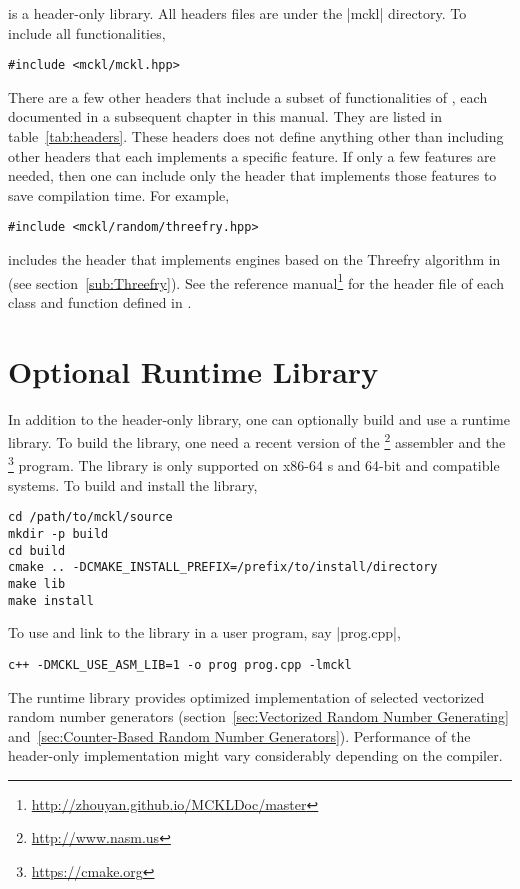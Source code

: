\mckl is a header-only library. All headers files are under the |mckl|
directory. To include all functionalities,
\begin{verbatim}
#include <mckl/mckl.hpp>
\end{verbatim}
There are a few other headers that include a subset of functionalities of
\mckl, each documented in a subsequent chapter in this manual. They are listed
in table~\ref{tab:headers}. These headers does not define anything other than
including other headers that each implements a specific feature. If only a few
features are needed, then one can include only the header that implements those
features to save compilation time. For example,
\begin{verbatim}
#include <mckl/random/threefry.hpp>
\end{verbatim}
includes the header that implements \rng engines based on the Threefry
algorithm in~\cite{Salmon:2011um} (see section~\ref{sub:Threefry}). See the
reference manual\footnote{\url{http://zhouyan.github.io/MCKLDoc/master}} for
the header file of each class and function defined in \mckl.

\section{Optional Runtime Library}
\label{sec:Optional Runtime Library}

In addition to the header-only library, one can optionally build and use a
runtime library. To build the library, one need a recent version of the
\nasm\footnote{\url{http://www.nasm.us}} assembler and the
\cmake\footnote{\url{https://cmake.org}} program. The library is only supported
on x86-64 \cpu{}s and 64-bit \unix and compatible systems. To build and install
the library,
\begin{verbatim}
cd /path/to/mckl/source
mkdir -p build
cd build
cmake .. -DCMAKE_INSTALL_PREFIX=/prefix/to/install/directory
make lib
make install
\end{verbatim}
To use and link to the library in a user program, say |prog.cpp|,
\begin{verbatim}
c++ -DMCKL_USE_ASM_LIB=1 -o prog prog.cpp -lmckl
\end{verbatim}

The runtime library provides optimized implementation of selected vectorized
random number generators (section~\ref{sec:Vectorized Random Number Generating}
and~\ref{sec:Counter-Based Random Number Generators}). Performance of the
header-only implementation might vary considerably depending on the compiler.

